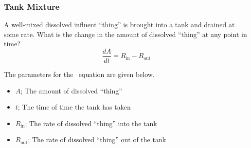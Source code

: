                             \subsubsection{Tank Mixture} \label{subsubsec:Tank Mixture}
                            \begin{definition} \label{def:Tank Mixture}
                              A well-mixed dissolved influent ``thing'' is brought into a tank and drained at some rate.
                              What is the change in the amount of dissolved ``thing'' at any point in time?
                              \begin{equation}\label{eq:Tank Mixture}
                                \frac{dA}{dt} = R_{\text{in}} - R_{\text{out}}
                              \end{equation}
                              \begin{remark}
                                The parameters for the ~equation are given below.
                                \begin{itemize}[noitemsep, nolistsep]
                                \item $A$; The amount of dissolved ``thing''
                                \item $t$; The time of time the tank has taken
                                \item $R_{\text{in}}$; The rate of dissolved ``thing'' into the tank
                                \item $R_{\text{out}}$; The rate of dissolved ``thing'' out of the tank
                                \end{itemize}
                              \end{remark}
                            \end{definition}
                            

